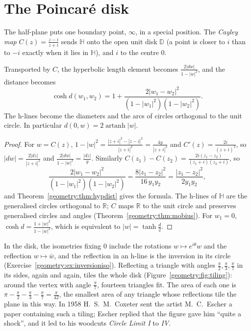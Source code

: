 \section{The Poincar\'e disk}

The half-plane puts one boundary point, $\infty$, in a special position. The \emph{Cayley map} $C(z)=\frac{z-i}{z+i}$ sends $\mathbb H$ onto the open unit disk
$\mathbb D$ (a point is closer to $i$ than to $-i$ exactly when it lies in $\mathbb H$), and $i$ to the centre $0$.

\begin{proposition}\label{geometry:prop:disk}
Transported by $C$, the hyperbolic length element becomes $\frac{2|dw|}{1-|w|^2}$, and the distance becomes
\[
\cosh d(w_1,w_2)=1+\frac{2|w_1-w_2|^2}{(1-|w_1|^2)(1-|w_2|^2)}.
\]
The h-lines become the diameters and the arcs of circles orthogonal to the unit circle. In particular $d(0,w)=2\operatorname{artanh}|w|$.
\end{proposition}

\begin{proof}
For $w=C(z)$, $1-|w|^2=\frac{|z+i|^2-|z-i|^2}{|z+i|^2}=\frac{4y}{|z+i|^2}$ and $C'(z)=\frac{2i}{(z+i)^2}$, so $|dw|=\frac{2|dz|}{|z+i|^2}$ and
$\frac{2|dw|}{1-|w|^2}=\frac{|dz|}y$. Similarly $C(z_1)-C(z_2)=\frac{2i(z_1-z_2)}{(z_1+i)(z_2+i)}$, so
\[
\frac{2|w_1-w_2|^2}{(1-|w_1|^2)(1-|w_2|^2)}=\frac{8|z_1-z_2|^2}{16\,y_1y_2}=\frac{|z_1-z_2|^2}{2y_1y_2},
\]
and Theorem~\ref{geometry:thm:hypdist} gives the formula. The h-lines of $\mathbb H$ are the generalised circles orthogonal to $\mathbb R$; $C$ maps $\mathbb R$ to
the unit circle and preserves generalised circles and angles (Theorem~\ref{geometry:thm:mobius}). For $w_1=0$, $\cosh d=\frac{1+|w|^2}{1-|w|^2}$, which is
equivalent to $|w|=\tanh\frac d2$.
\end{proof}

In the disk, the isometries fixing $0$ include the rotations $w\mapsto e^{i\theta}w$ and the reflection $w\mapsto\bar w$, and the reflection in an h-line is
the inversion in its circle (Exercise~\ref{geometry:ex:inversioniso}). Reflecting a triangle with angles $\frac\pi2,\frac\pi3,\frac\pi7$ in its sides, again and
again, tiles the whole disk (Figure~\ref{geometry:fig:tiling}): around the vertex with angle $\frac\pi7$, fourteen triangles fit. The area of each one is
$\pi-\frac\pi2-\frac\pi3-\frac\pi7=\frac\pi{42}$, the smallest area of any triangle whose reflections tile the plane in this way. In 1958 H.~S.~M.~Coxeter sent
the artist M.~C.~Escher a paper containing such a tiling; Escher replied that the figure gave him ``quite a shock'', and it led to his woodcuts \emph{Circle
Limit I} to \emph{IV}.

